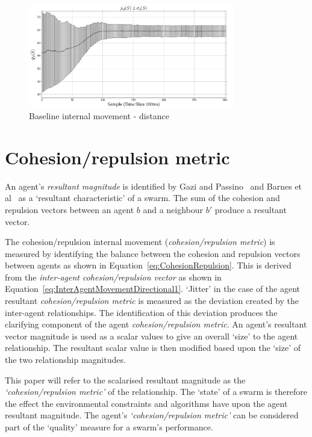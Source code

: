 \documentclass{ieeeaccess}
\begin{document}
\begin{figure}[H]
\begin{center}
\includegraphics[width=9cm]{figures/BaselineDistance1}
\end{center}
\caption{Baseline internal movement - distance\label{coord:BaselineDistance1}}
\end{figure}

\section{Cohesion/repulsion metric\label{section:MagnitudeDynamics}}
An agent's \emph{resultant magnitude} is identified by Gazi and Passino~\cite{GP:11} and Barnes et al~\cite{BFV:07} as a `resultant characteristic' of a swarm. The sum of the cohesion and repulsion vectors between an agent $b$ and a neighbour $b'$ produce a resultant vector.

The cohesion/repulsion internal movement (\emph{cohesion/repulsion metric}) is measured by identifying the balance between the cohesion and repulsion vectors between agents as shown in Equation~\ref{eq:CohesionRepulsion}. This is derived from the \emph{inter-agent cohesion/repulsion vector} as shown in Equation~\ref{eq:InterAgentMovementDirectional1}. `Jitter' in the case of the agent resultant \emph{cohesion/repulsion metric} is measured as the deviation created by the inter-agent relationships. The identification of this deviation produces the clarifying component of the agent \emph{cohesion/repulsion metric}.
An agent's resultant vector magnitude is used as a scalar values to give an overall `size' to the agent relationship. The resultant scalar value is then modified based upon the `size' of the two relationship magnitudes.

This paper will refer to the scalarised resultant magnitude as the \emph{`cohesion/repulsion metric'} of the relationship. The `state' of a swarm is therefore the effect the environmental constraints and algorithms have upon the agent resultant magnitude. The agent's \emph{`cohesion/repulsion metric'} can be considered part of the `quality' measure for a swarm's performance.
\end{document}
